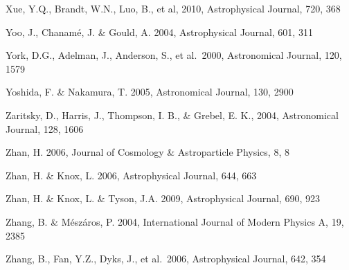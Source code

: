 \documentclass{emulateapj}
\begin{document}
\begin{thebibliography}{}
\bibitem[()]{} Xue, Y.Q., Brandt, W.N., Luo, B., et al, 2010,  Astrophysical Journal, 720, 368

\bibitem[()]{} Yoo, J., Chanam\'{e}, J. \& Gould, A. 2004, Astrophysical Journal, 601, 311

\bibitem[()]{} York, D.G., Adelman, J., Anderson, S., et al.~2000, Astronomical Journal, 120, 1579 

\bibitem[()]{} Yoshida, F. \& Nakamura, T. 2005, Astronomical Journal, 130, 2900 

\bibitem[()]{} Zaritsky, D., Harris, J., Thompson, I. B., \& Grebel, E. K., 2004, Astronomical Journal, 128, 1606

\bibitem[()]{} Zhan, H. 2006, Journal of Cosmology \& Astroparticle Physics, 8, 8

\bibitem[()]{} Zhan, H. \& Knox, L. 2006,  Astrophysical Journal, 644, 663

\bibitem[()]{} Zhan, H. \& Knox, L. \& Tyson, J.A. 2009,  Astrophysical Journal, 690, 923
	
\bibitem[()]{} Zhang, B. \& M\'{e}sz\'{a}ros, P. 2004, International Journal of Modern Physics A, 19, 2385

\bibitem[()]{} Zhang, B., Fan, Y.Z., Dyks, J., et al.~2006,  Astrophysical Journal, 642, 354

\end{thebibliography}
\end{document}
